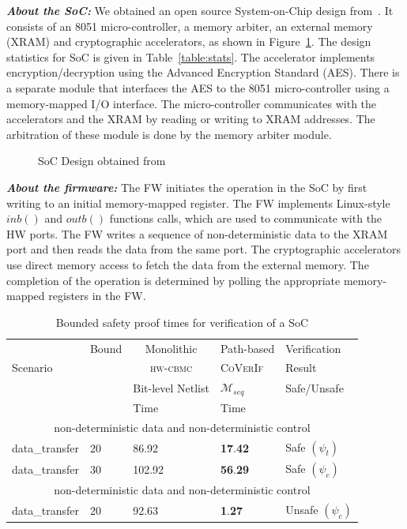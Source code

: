 \documentclass[sigconf]{acmart}
\newcommand{\tool}[1]{\textsc{#1}\xspace}
\newcommand{\hwcbmcv}{\tool{hw-cbmc}}
\newcommand{\verifox}{\tool{CoVerIf}}
\begin{document}
\textbf{\emph{About the SoC:}}
%
We obtained an open source System-on-Chip design
from~\cite{DBLP:conf/fmcad/SubramanyanVRM15}.  It consists of an 8051
micro-controller, a memory arbiter, an external memory (XRAM) and
cryptographic accelerators, as shown in Figure~\ref{fig:soc}.  
The design statistics for SoC is given in
Table~\ref{table:stats}.  The accelerator implements encryption/decryption 
using the Advanced Encryption Standard (AES).  There is a separate 
module that interfaces the AES to the 8051 micro-controller using 
a memory-mapped I/O interface.  The micro-controller communicates 
with the accelerators and the XRAM by reading or writing to 
XRAM addresses.  The arbitration of these module is done by 
the memory arbiter module. \\ 
%
\begin{figure}[t]
  \caption{SoC Design obtained from~\cite{DBLP:conf/fmcad/SubramanyanVRM15}
\label{fig:soc}}
\end{figure}
%
\textbf{\emph{About the firmware:}}
%
The FW initiates the operation in the SoC by first writing to an
initial memory-mapped register.  The FW implements Linux-style $inb()$
and $outb()$ functions calls, which are used to communicate with the HW
ports.  The FW writes a sequence of non-deterministic data to the XRAM
port and then reads the data from the same port.  The cryptographic
accelerators use direct memory access to fetch the data from the external
memory.  The completion of the operation is determined by polling the
appropriate memory-mapped registers in the FW.
%
\begin{table}
\begin{center}
{
\begin{scriptsize}
\begin{tabular}{|l|l|l|l|l|}
\hline
  & Bound & \multicolumn{1}{c|}{Monolithic} & \multicolumn{1}{c|}{Path-based} &
  Verification \\ 
\cline{3-4}
  Scenario &  & \multicolumn{1}{c|}{\hwcbmcv} & \verifox & Result \\ 
\cline{3-5}
      &       & Bit-level Netlist & $\mathcal{M}_{seq}$ & Safe/Unsafe \\
\cline{1-5}
      &       &   Time      & Time &  \\
\cline{1-5}      
\multicolumn{5}{|c|}{non-deterministic data and non-deterministic control} \\ \hline
  data\_transfer & 20 & 86.92 & \textbf{17}.\textbf{42} & Safe $(\psi_{t})$ \\
  \hline
  data\_transfer & 30 & 102.92 & \textbf{56}.\textbf{29} & Safe $(\psi_{c})$ \\ 
\hline
\multicolumn{5}{|c|}{non-deterministic data and non-deterministic control} \\ \hline
  data\_transfer & 20 & 92.63 & \textbf{1}.\textbf{27} & Unsafe $(\psi_{c})$ \\ 
\hline
\end{tabular}
\end{scriptsize}
}
\end{center}
\caption{Bounded safety proof times for verification of a SoC 
\label{table:SoC}}
\end{table}
\end{document}
